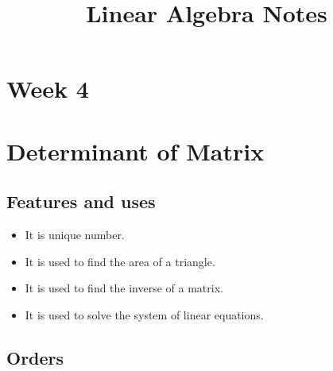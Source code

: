 \documentclass{article}
\title{\Huge{\textbf{Linear Algebra Notes}}}
\author{ }
\date{ }
\begin{document}
\maketitle
\tableofcontents
\newpage

\section*{\center\huge{Week 4}}

\section{Determinant of Matrix}

\subsection{Features and uses}

\begin{itemize}
	\addtolength\itemsep{-2.5mm}
	\item It is unique number.
	\item It is used to find the area of a triangle.
	\item It is used to find the inverse of a matrix.
	\item It is used to solve the system of linear equations.
\end{itemize}

\subsection{Orders}
\end{document}
